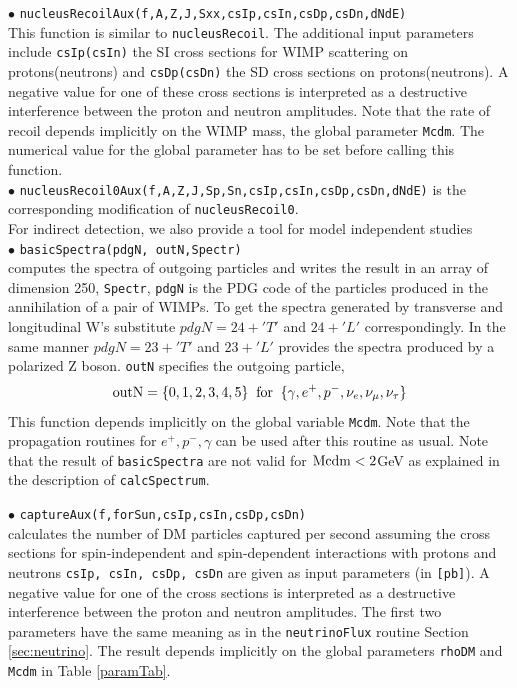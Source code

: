 \documentclass[12pt,a4paper]{article}
\begin{document}
\noindent
$\bullet$ \verb|nucleusRecoilAux(f,A,Z,J,Sxx,csIp,csIn,csDp,csDn,dNdE)|\\
This function is similar to \verb|nucleusRecoil|. 
The additional input parameters include \verb|csIp(csIn)| the SI cross 
sections for WIMP scattering on protons(neutrons) and
\verb|csDp(csDn)| the SD cross sections on protons(neutrons). 
A negative value for one of these cross sections is interpreted as a destructive 
interference between the
proton and neutron amplitudes. Note that the rate of recoil  depends 
implicitly on the WIMP mass, the  global parameter \verb|Mcdm|.
 The numerical value for the global parameter has to be
set before calling this function.\\
\noindent
$\bullet$ \verb|nucleusRecoil0Aux(f,A,Z,J,Sp,Sn,csIp,csIn,csDp,csDn,dNdE)|
is the corresponding modification of \verb|nucleusRecoil0|.\\

For indirect detection, we also provide a tool for model independent studies\\ 
\noindent
$\bullet$ \verb|basicSpectra(pdgN, outN,Spectr)|\\
computes the spectra of outgoing particles and writes the result in an array of dimension 250, \verb|Spectr|,
\verb|pdgN| is the PDG code of the particles produced in the annihilation of a pair of 
WIMPs. To get the spectra generated by transverse and longitudinal W's substitute 
$ pdgN=24+'T'$ and $24+'L'$ correspondingly. In the same manner $pdgN=23+'T'$ and
$23+'L'$  provides the spectra produced by a polarized Z boson.
 \verb|outN|  specifies the outgoing particle,
$$ {\rm outN} = \{0,1,2,3,4,5\} \;\; {\rm for}\;\; \{\gamma,   e^+,  p^-, \nu_e,
\nu_{\mu},\nu_{\tau}\} $$
This function depends implicitly on the global variable  {\tt Mcdm}.
Note that the  propagation routines for $e^+,p^-,\gamma$ can be used after 
this routine as usual. Note that the result of {\tt basicSpectra}
are not valid for ${\rm Mcdm} < 2$GeV as explained in the description of {\tt calcSpectrum}.

\noindent $\bullet$ \verb|captureAux(f,forSun,csIp,csIn,csDp,csDn)|\\
calculates the number of DM particles captured per second assuming the cross sections
for  spin-independent and spin-dependent 
interactions with protons and neutrons   {\tt csIp, csIn, csDp, csDn} are
given as input parameters (in {\tt [pb]}). 
A negative value for one of the cross sections  is interpreted as a destructive
interference between the  proton and neutron amplitudes. The first two
parameters have the same meaning as in the {\tt neutrinoFlux} routine Section \ref{sec:neutrino}. The
result  depends implicitly on the global parameters {\tt rhoDM} and {\tt
Mcdm} in Table \ref{paramTab}. 
\end{document}
